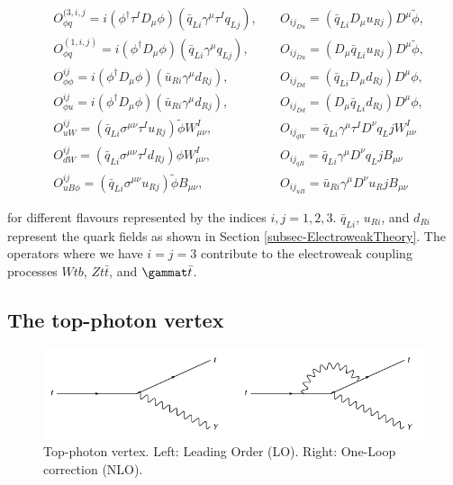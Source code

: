 \begin{align}
& O^{(3, i, j}_{\phi q} = i(\phi^{\dagger}\tau^I D_{\mu} \phi)(\bar{q}_{Li}\gamma^{\mu}\tau^I q_{Lj}), \quad & O_{ij}_{Du} = (\bar{q}_{Li} D_{\mu} u_{Rj}) D^{\mu} \tilde{\phi}, \\
& O^{(1, i, j)}_{\phi q} = i(\phi^{\dagger} D_{\mu} \phi)(\bar{q}_{Li}\gamma^{\mu} q_{Lj}), \quad & O_{ij}_{\bar{D}u} = (D_{\mu} \bar{q}_{Li} u_{Rj}) D^{\mu} \tilde{\phi}, \\
& O^{ij}_{\phi \phi} = i(\phi^{\dagger} D_{\mu} \phi)(\bar{u}_{Ri}\gamma^{\mu} d_{Rj}), \quad & O_{ij}_{Dd} = (\bar{q}_{Li} D_{\mu} d_{Rj}) D^{\mu} \phi, \\
& O^{ij}_{\phi u} = i(\phi^{\dagger} D_{\mu} \phi)(\bar{u}_{Ri}\gamma^{\mu} d_{Rj}), \quad & O_{ij}_{\bar{D}d} = (D_{\mu} \bar{q}_{Li} d_{Rj}) D^{\mu} \phi, \\
& O^{ij}_{uW} = (\bar{q}_{Li} \sigma^{\mu \nu} \tau^I u_{Rj})\tilde{\phi} W^I_{\mu \nu}, \quad & O_{ij}_{qW} = \bar{q}_{Li} \gamma^{\mu} \tau^I D^{\nu} q_Lj W^I_{\mu \nu}\\
& O^{ij}_{dW} = (\bar{q}_{Li} \sigma^{\mu \nu} \tau^I d_{Rj})\phi W^I_{\mu \nu}, \quad & O_{ij}_{qB} = \bar{q}_{Li} \gamma^{\mu} D^{\nu} q_Lj B_{\mu \nu}\\
& O^{ij}_{uB\phi} = (\bar{q}_{Li} \sigma^{\mu \nu} u_{Rj})\tilde{\phi} B_{\mu \nu}, \quad & O_{ij}_{uB} = \bar{u}_{Ri} \gamma^{\mu} D^{\nu} u_Rj B_{\mu \nu}
\end{align}

for different flavours represented by the indices $i,j = 1,2,3$. $\bar{q}_{Li}$, $u_{Ri}$, and $d_{Ri}$ represent the quark fields as shown in Section \ref{subsec-ElectroweakTheory}. The operators where we have $i = j = 3$ contribute to the electroweak coupling processes $Wtb$, $Zt\bar{t}$, and $\gammat\bar{t}$. 


\subsection{The top-photon vertex}

\begin{figure} \label{fig-TopPhotonVertex}
\begin{center}
\includegraphics[width=\textwidth]{Figures/TopPhotonVertex.png}
\caption{Top-photon vertex. Left: Leading Order (LO). Right: One-Loop correction (NLO).}
\end{center}
\end{figure}

